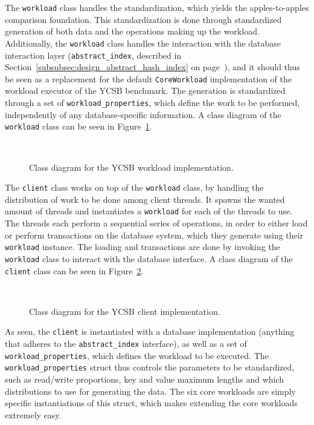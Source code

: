\documentclass[11pt]{article} %
\begin{document}
The \verb|workload| class handles the standardization, which yields the apples-to-apples comparison foundation. This standardization is done through standardized generation of both data and the operations making up the workload. Additionally, the \verb|workload| class handles the interaction with the database interaction layer (\verb|abstract_index|, described in Section~\ref{subsubsec:design_abstract_hash_index} on page~\pageref{subsubsec:design_abstract_hash_index}), and it should thus be seen as a replacement for the default \verb|CoreWorkload| implementation of the workload executor of the YCSB benchmark. The generation is standardized through a set of \verb|workload_properties|, which define the work to be performed, independently of any database-specific information. A class diagram of the \verb|workload| class can be seen in Figure~\ref{fig:UML_workload}.\\

\begin{figure}[H]
  \centering
  \\
  \caption{Class diagram for the YCSB workload implementation.}\label{fig:UML_workload}
\end{figure}

The \verb|client| class works on top of the \verb|workload| class, by handling the distribution of work to be done among client threads. It spawns the wanted amount of threads and instantiates a \verb|workload| for each of the threads to use. The threads each perform a sequential series of operations, in order to either load or perform transactions on the database system, which they generate using their \verb|workload| instance. The loading and transactions are done by invoking the \verb|workload| class to interact with the database interface. A class diagram of the \verb|client| class can be seen in Figure~\ref{fig:UML_client}. \\

\begin{figure}[H]
  \\
  \caption{Class diagram for the YCSB client implementation.}\label{fig:UML_client}
\end{figure}

As seen, the \verb|client| is instantiated with a database implementation (anything that adheres to the \verb|abstract_index| interface), as well as a set of \verb|workload_properties|, which defines the workload to be executed. The \verb|workload_properties| struct thus controls the parameters to be standardized, such as read/write proportions, key and value maximum lengths and which distributions to use for generating the data. The six core workloads are simply specific instantiations of this struct, which makes extending the core workloads extremely easy. \\
\end{document}
